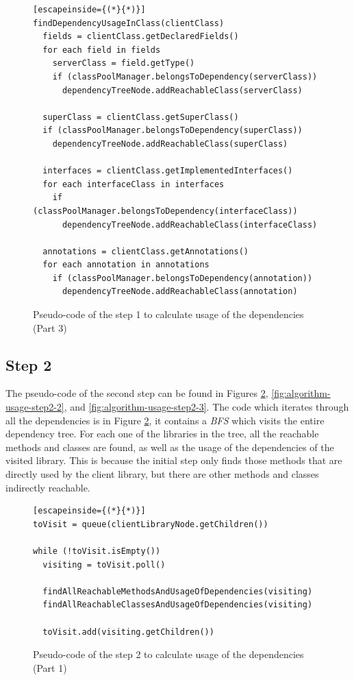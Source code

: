 \begin{figure}[ht!]
\begin{lstlisting}[escapeinside={(*}{*)}]
findDependencyUsageInClass(clientClass)
  fields = clientClass.getDeclaredFields()
  for each field in fields
    serverClass = field.getType()
    if (classPoolManager.belongsToDependency(serverClass))
      dependencyTreeNode.addReachableClass(serverClass)

  superClass = clientClass.getSuperClass()
  if (classPoolManager.belongsToDependency(superClass))
    dependencyTreeNode.addReachableClass(superClass)

  interfaces = clientClass.getImplementedInterfaces()
  for each interfaceClass in interfaces
    if (classPoolManager.belongsToDependency(interfaceClass))
      dependencyTreeNode.addReachableClass(interfaceClass)

  annotations = clientClass.getAnnotations()
  for each annotation in annotations
    if (classPoolManager.belongsToDependency(annotation))
      dependencyTreeNode.addReachableClass(annotation)
\end{lstlisting}
\caption{Pseudo-code of the step 1 to calculate usage of the dependencies (Part 3)}
\label{fig:algorithm-usage-step1-3}
\end{figure}

\subsection{Step 2}
The pseudo-code of the second step can be found in Figures \ref{fig:algorithm-usage-step2-1}, \ref{fig:algorithm-usage-step2-2}, and \ref{fig:algorithm-usage-step2-3}. The code which iterates through all the dependencies is in Figure \ref{fig:algorithm-usage-step2-1}, it contains a \textit{BFS} which visits the entire dependency tree. For each one of the libraries in the tree, all the reachable methods and classes are found, as well as the usage of the dependencies of the visited library. This is because the initial step only finds those methods that are directly used by the client library, but there are other methods and classes indirectly reachable.

\begin{figure}[ht!]
\begin{lstlisting}[escapeinside={(*}{*)}]
toVisit = queue(clientLibraryNode.getChildren())

while (!toVisit.isEmpty())
  visiting = toVisit.poll()

  findAllReachableMethodsAndUsageOfDependencies(visiting)
  findAllReachableClassesAndUsageOfDependencies(visiting)

  toVisit.add(visiting.getChildren())
\end{lstlisting}
\caption{Pseudo-code of the step 2 to calculate usage of the dependencies (Part 1)}
\label{fig:algorithm-usage-step2-1}
\end{figure}

